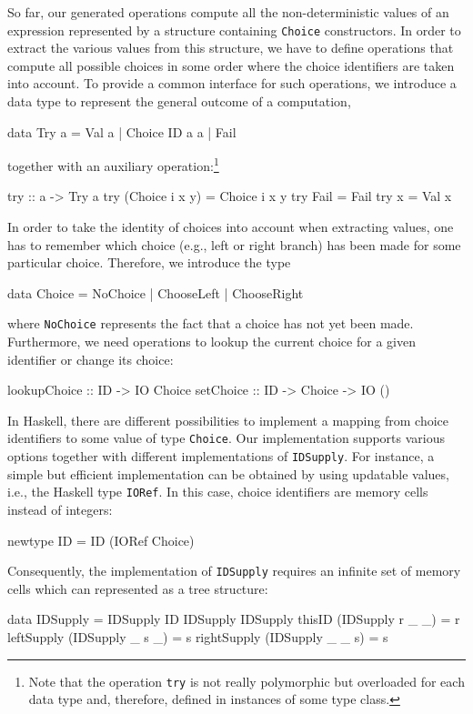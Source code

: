 \documentclass{llncs}
\newcommand{\code}[1]{\mbox{\small\texttt{#1}}}
\begin{document}
So far, our generated operations compute all the non-deterministic
values of an expression represented by a structure containing
\code{Choice} constructors. In order to extract the various
values from this structure, we have to define operations
that compute all possible choices in some order where the choice identifiers
are taken into account.
To provide a common interface for such operations, we introduce
a data type to represent the general outcome of a computation,
\begin{haskell}
  data Try a = Val a | Choice ID a a | Fail
\end{haskell}
together with an auxiliary operation:\footnote{Note that the
operation \code{try} is not really polymorphic but overloaded
for each data type and, therefore, defined in instances of some type class.}
\begin{haskell}
  try :: a -> Try a
  try (Choice i x y) = Choice i x y
  try Fail           = Fail
  try x              = Val x
\end{haskell}
In order to take the identity of choices into account when extracting values,
one has to remember which choice (e.g., left or right branch)
has been made for some particular choice.
Therefore, we introduce the type
\begin{haskell}
  data Choice = NoChoice | ChooseLeft | ChooseRight
\end{haskell}
where \code{NoChoice} represents the fact that a choice has not yet been made.
Furthermore, we need operations to lookup the current choice
for a given identifier or change its choice:
\begin{haskell}
  lookupChoice :: ID -> IO Choice
  setChoice    :: ID -> Choice -> IO ()
\end{haskell}
In Haskell, there are different possibilities to implement a mapping
from choice identifiers to some value of type \code{Choice}.
Our implementation supports various options together with different
implementations of \code{IDSupply}.
For instance, a simple but efficient implementation can be obtained by
using updatable values, i.e., the Haskell type \code{IORef}.
In this case, choice identifiers are memory cells instead of integers:
\begin{haskell}
  newtype ID = ID (IORef Choice)
\end{haskell}
Consequently, the implementation of \code{IDSupply} requires
an infinite set of memory cells which can represented as a tree structure:
\begin{haskell}
  data IDSupply = IDSupply ID IDSupply IDSupply
  thisID      (IDSupply r _ _) = r
  leftSupply  (IDSupply _ s _) = s
  rightSupply (IDSupply _ _ s) = s
  \end{haskell}
\end{document}
